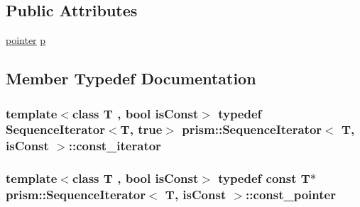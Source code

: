 \subsection*{Public Attributes}
\begin{DoxyCompactItemize}
\item 
\hyperlink{structprism_1_1_sequence_iterator_a024492122445836e94097e10b02b700a}{pointer} \hyperlink{structprism_1_1_sequence_iterator_aea1d104b7fda3ca8899fefa896fa59e6}{p}
\end{DoxyCompactItemize}


\subsection{Member Typedef Documentation}
\subsubsection[{\texorpdfstring{const\+\_\+iterator}{const_iterator}}]{\setlength{\rightskip}{0pt plus 5cm}template$<$class T , bool is\+Const$>$ typedef {\bf Sequence\+Iterator}$<$T, true$>$ {\bf prism\+::\+Sequence\+Iterator}$<$ T, is\+Const $>$\+::{\bf const\+\_\+iterator}}\hypertarget{structprism_1_1_sequence_iterator_a8be80243dfbbc36132e108a7858eafd0}{}\label{structprism_1_1_sequence_iterator_a8be80243dfbbc36132e108a7858eafd0}
\subsubsection[{\texorpdfstring{const\+\_\+pointer}{const_pointer}}]{\setlength{\rightskip}{0pt plus 5cm}template$<$class T , bool is\+Const$>$ typedef const T$\ast$ {\bf prism\+::\+Sequence\+Iterator}$<$ T, is\+Const $>$\+::{\bf const\+\_\+pointer}}\hypertarget{structprism_1_1_sequence_iterator_a4c3367cd1e3aacc1cd902bab256ee6b2}{}\label{structprism_1_1_sequence_iterator_a4c3367cd1e3aacc1cd902bab256ee6b2}
